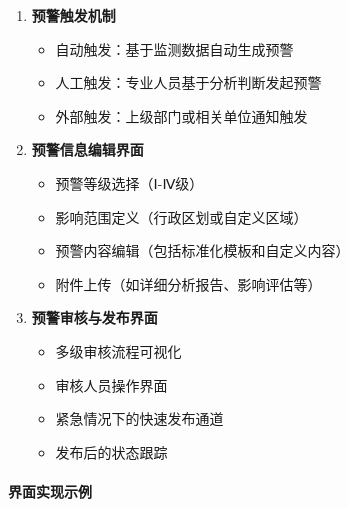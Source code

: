 \begin{enumerate}
\def\labelenumi{\arabic{enumi}.}
\tightlist
\item
  \textbf{预警触发机制}

  \begin{itemize}
  \tightlist
  \item
    自动触发：基于监测数据自动生成预警
  \item
    人工触发：专业人员基于分析判断发起预警
  \item
    外部触发：上级部门或相关单位通知触发
  \end{itemize}
\item
  \textbf{预警信息编辑界面}

  \begin{itemize}
  \tightlist
  \item
    预警等级选择（Ⅰ-Ⅳ级）
  \item
    影响范围定义（行政区划或自定义区域）
  \item
    预警内容编辑（包括标准化模板和自定义内容）
  \item
    附件上传（如详细分析报告、影响评估等）
  \end{itemize}
\item
  \textbf{预警审核与发布界面}

  \begin{itemize}
  \tightlist
  \item
    多级审核流程可视化
  \item
    审核人员操作界面
  \item
    紧急情况下的快速发布通道
  \item
    发布后的状态跟踪
  \end{itemize}
\end{enumerate}

\paragraph{界面实现示例}\label{ux754cux9762ux5b9eux73b0ux793aux4f8b-1}

